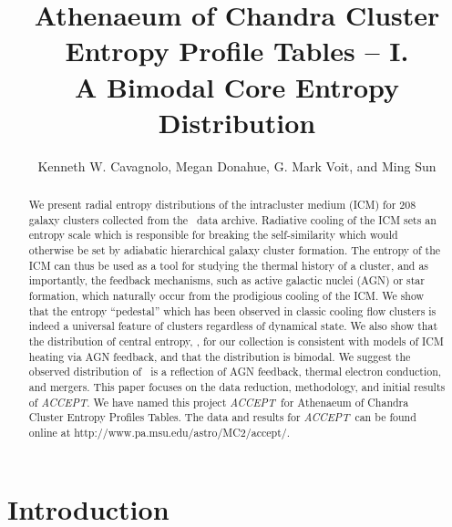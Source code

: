 \documentclass[12pt, preprint]{aastex}
\newcommand{\accept}{\textit{ACCEPT}}
\begin{document}
\title{Athenaeum of Chandra Cluster Entropy Profile Tables -- I.\\
A Bimodal Core Entropy Distribution}
\author{Kenneth W. Cavagnolo,
	Megan Donahue,
	G. Mark Voit, and
	Ming Sun}



\begin{abstract}
We present radial entropy distributions of the intracluster
medium (ICM) for 208 galaxy clusters collected from the \Chandra\ data
archive. Radiative cooling of the ICM sets an entropy scale which is
responsible for breaking the self-similarity which would otherwise be
set by adiabatic hierarchical galaxy cluster formation. The entropy of
the ICM can thus be used as a tool for studying the thermal history of
a cluster, and as importantly, the feedback mechanisms, such as active
galactic nuclei (AGN) or star formation, which naturally occur from
the prodigious cooling of the ICM. We show that the entropy
``pedestal'' which has been observed in classic cooling flow clusters
is indeed a universal feature of clusters regardless of dynamical
state. We also show that the distribution of central entropy, \kna,
for our collection is consistent with models of ICM heating via AGN
feedback, and that the distribution is bimodal. We suggest the
observed distribution of \kna\ is a reflection of AGN feedback,
thermal electron conduction, and mergers. This paper focuses on
the data reduction, methodology, and initial results of \accept.
We have named this project \accept\ for Athenaeum of Chandra Cluster
Entropy Profiles Tables. The data and results for \accept\ can be
found online at http://www.pa.msu.edu/astro/MC2/accept/.
\end{abstract}



\section{Introduction}
\label{sec:intro}
\end{document}
